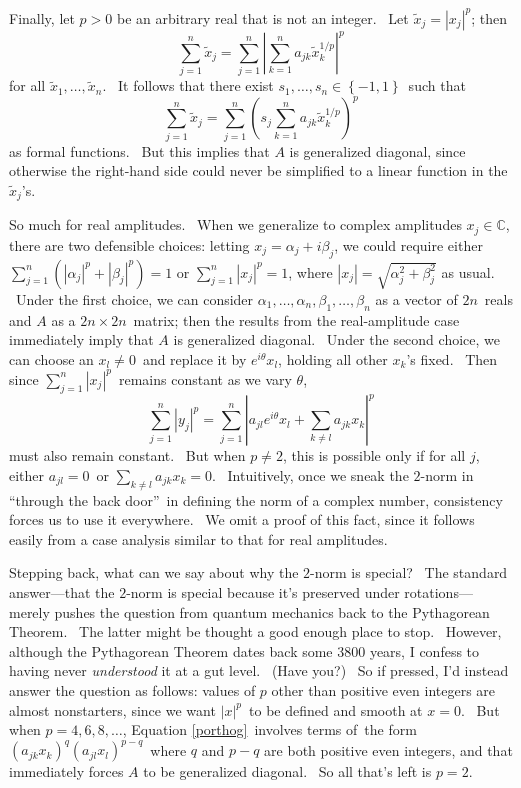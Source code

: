 \documentclass{article}%
\begin{document}
Finally, let $p>0$ be an arbitrary real that is not an integer. \ Let
$\widetilde{x}_{j}=\left\vert x_{j}\right\vert ^{p}$; then%
\[
\sum_{j=1}^{n}\widetilde{x}_{j}=\sum_{j=1}^{n}\left\vert \sum_{k=1}^{n}%
a_{jk}\widetilde{x}_{k}^{1/p}\right\vert ^{p}%
\]
for all $\widetilde{x}_{1},\ldots,\widetilde{x}_{n}$. \ It follows that there
exist $s_{1},\ldots,s_{n}\in\left\{  -1,1\right\}  $\ such that%
\[
\sum_{j=1}^{n}\widetilde{x}_{j}=\sum_{j=1}^{n}\left(  s_{j}\sum_{k=1}%
^{n}a_{jk}\widetilde{x}_{k}^{1/p}\right)  ^{p}%
\]
as formal functions. \ But this implies that $A$ is generalized diagonal,
since otherwise the right-hand side could never be simplified to a linear
function in the $\widetilde{x}_{j}$'s.

So much for real amplitudes. \ When we generalize to complex amplitudes
$x_{j}\in\mathbb{C}$, there are two defensible choices: letting $x_{j}%
=\alpha_{j}+i\beta_{j}$, we could require either $\sum_{j=1}^{n}\left(
\left\vert \alpha_{j}\right\vert ^{p}+\left\vert \beta_{j}\right\vert
^{p}\right)  =1$ or $\sum_{j=1}^{n}\left\vert x_{j}\right\vert ^{p}=1$, where
$\left\vert x_{j}\right\vert =\sqrt{\alpha_{j}^{2}+\beta_{j}^{2}}$ as usual.
\ Under the first choice, we can consider $\alpha_{1},\ldots,\alpha_{n}%
,\beta_{1},\ldots,\beta_{n}$ as a vector of $2n$\ reals and $A$ as a
$2n\times2n$\ matrix; then the results from the real-amplitude case
immediately imply that $A$ is generalized diagonal. \ Under the second choice,
we can choose an $x_{l}\neq0$\ and replace it by $e^{i\theta}x_{l}$, holding
all other $x_{k}$'s fixed. \ Then since $\sum_{j=1}^{n}\left\vert
x_{j}\right\vert ^{p}$\ remains constant as we vary $\theta$,%
\[
\sum_{j=1}^{n}\left\vert y_{j}\right\vert ^{p}=\sum_{j=1}^{n}\left\vert
a_{jl}e^{i\theta}x_{l}+\sum_{k\neq l}a_{jk}x_{k}\right\vert ^{p}%
\]
must also remain constant. \ But when $p\neq2$, this is possible only if for
all $j$, either $a_{jl}=0$\ or $\sum_{k\neq l}a_{jk}x_{k}=0$. \ Intuitively,
once we sneak the $2$-norm in \textquotedblleft through the back
door\textquotedblright\ in defining the norm of a complex number, consistency
forces us to use it everywhere. \ We omit a proof of this fact, since it
follows easily from a case analysis similar to that for real amplitudes.

Stepping back, what can we say about why the $2$-norm is special? \ The
standard answer---that the $2$-norm is special because it's preserved under
rotations---merely pushes the question from quantum mechanics back to the
Pythagorean Theorem. \ The latter might be thought a good enough place to
stop. \ However, although the Pythagorean Theorem dates back some 3800 years,
I confess to having never \textit{understood} it at a gut level. \ (Have you?)
\ So if pressed, I'd instead answer the question as follows: values of $p$
other than positive even integers are almost nonstarters, since we want
$\left\vert x\right\vert ^{p}$\ to be defined and smooth at $x=0$. \ But when
$p=4,6,8,\ldots$, Equation \ref{porthog}\ involves terms of\ the form $\left(
a_{jk}x_{k}\right)  ^{q}\left(  a_{jl}x_{l}\right)  ^{p-q}$\ where $q$ and
$p-q$ are both positive even integers, and that immediately forces $A$ to be
generalized diagonal. \ So all that's left is $p=2$.
\end{document}
